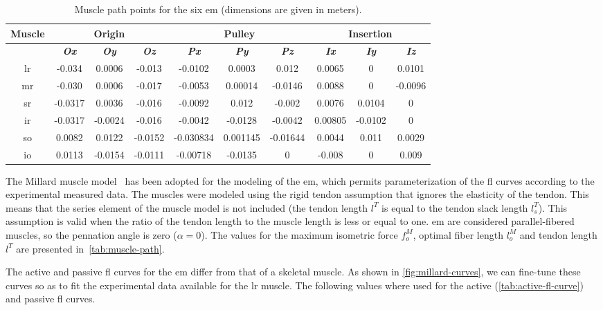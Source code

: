 \documentclass[11pt,a4paper,draft=false]{report}
\begin{document}
\begin{table}[ht]
  \centering
  \caption{Muscle path points for the six \gls{em} (dimensions are given in
    meters).}\label{tab:muscle-path}
  \begin{tabular}{@{}cccccccccc@{}}
    \toprule
    \textbf{Muscle}
    & \multicolumn{3}{c}{\textbf{Origin}}
    & \multicolumn{3}{c}{\textbf{Pulley}}
    & \multicolumn{3}{c}{\textbf{Insertion}} \\
    \midrule
    & \textit{\textbf{Ox}} & \textit{\textbf{Oy}} & \textit{\textbf{Oz}}
    & \textit{\textbf{Px}} & \textit{\textbf{Py}} & \textit{\textbf{Pz}}
    & \textit{\textbf{Ix}} & \textit{\textbf{Iy}} & \textit{\textbf{Iz}} \\
    \midrule
    \gls{lr} & -0.034 & 0.0006 & -0.013 & -0.0102 & 0.0003 & 0.012 & 0.0065 & 0 & 0.0101 \\
    \gls{mr} & -0.030 & 0.0006 & -0.017 & -0.0053 & 0.00014 & -0.0146 & 0.0088 & 0 & -0.0096 \\
    \gls{sr} & -0.0317 & 0.0036 & -0.016 & -0.0092 & 0.012 & -0.002 & 0.0076 & 0.0104 & 0 \\
    \gls{ir} & -0.0317 & -0.0024 & -0.016 & -0.0042 & -0.0128 & -0.0042 & 0.00805 & -0.0102 & 0 \\
    \gls{so} & 0.0082 & 0.0122 & -0.0152 & -0.030834 & 0.001145 & -0.01644 & 0.0044 & 0.011 & 0.0029 \\
    \gls{io} & 0.0113 & -0.0154 & -0.0111 & -0.00718 & -0.0135 & 0 & -0.008 & 0 & 0.009 \\
    \bottomrule
  \end{tabular}
\end{table}

The Millard muscle model~\cite{Millard2013} has been adopted for the modeling of
the \gls{em}, which permits parameterization of the \gls{fl} curves according to
the experimental measured data. The muscles were modeled using the rigid tendon
assumption that ignores the elasticity of the tendon. This means that the series
element of the muscle model is not included (the tendon length $l^T$ is equal to
the tendon slack length $l_s^T$). This assumption is valid when the ratio of the
tendon length to the muscle length is less or equal to one. \gls{em} are
considered parallel-fibered muscles, so the pennation angle is zero
($\alpha = 0$). The values for the maximum isometric force $f_o^M$, optimal
fiber length $l_o^M$ and tendon length $l^T$ are presented
in~\autoref{tab:muscle-path}.

The active and passive \gls{fl} curves for the \gls{em} differ from that of a
skeletal muscle. As shown in \autoref{fig:millard-curves}, we can fine-tune
these curves so as to fit the experimental data available for the \gls{lr}
muscle. The following values where used for the active
(\autoref{tab:active-fl-curve}) and passive \gls{fl} curves.
\end{document}
